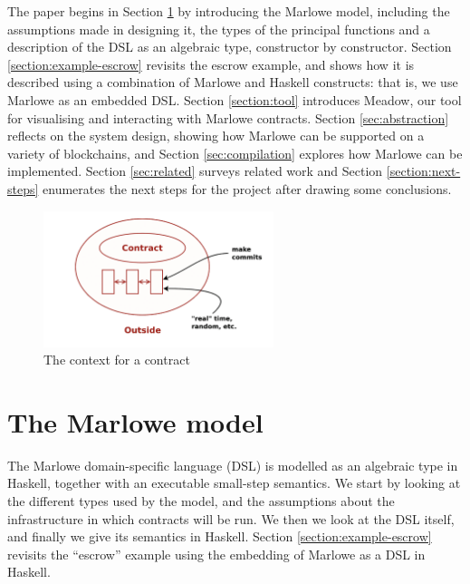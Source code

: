 \documentclass[runningheads]{llncs}
\begin{document}
The paper begins in Section \ref{section:model} by introducing the Marlowe 
model, including the assumptions made in designing it, the types of the principal functions and a description of the DSL as an algebraic type, constructor by constructor. 
Section \ref{section:example-escrow} revisits the escrow example, and shows 
how it is described using a combination of Marlowe and Haskell constructs: that is, we use Marlowe as an embedded DSL. 
Section \ref{section:tool} introduces Meadow, our tool for visualising and interacting with Marlowe contracts.
Section \ref{sec:abstraction} reflects on the system design, showing how Marlowe can be supported on a variety of blockchains, and Section \ref{sec:compilation} explores how Marlowe can be implemented. Section \ref{sec:related} surveys related work and Section 
\ref{section:next-steps} enumerates the next steps for the project after drawing some conclusions.

\begin{figure}[t]
\begin{center}
\includegraphics[width=0.6\textwidth]{pix/context.png}
\caption{The context for a contract}
\label{fig:context}
\end{center}
\vspace*{-8mm}
\end{figure}


\section{The Marlowe model}
\label{section:model}

The Marlowe domain-specific language (DSL) is modelled as an algebraic type in Haskell, together with an executable small-step semantics. 
We start by looking at the different types used by the model, and the assumptions about the infrastructure in which contracts will be run. We then we look at the  DSL itself, 
and finally we give its semantics in Haskell. Section 
\ref{section:example-escrow} revisits the ``escrow'' example using the embedding of Marlowe as a DSL in Haskell.
\end{document}
